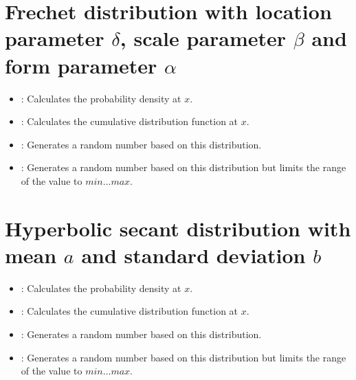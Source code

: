 \section{Frechet distribution with location parameter \texorpdfstring{$\delta$}{delta}, scale parameter \texorpdfstring{$\beta$}{beta} and form parameter \texorpdfstring{$\alpha$}{alpha}}

\begin{itemize}

\item
{}:
Calculates the probability density at $x$.

\item
{}:
Calculates the cumulative distribution function at $x$.

\item
{}:
Generates a random number based on this distribution.

\item
{}:
Generates a random number based on this distribution but limits the range of the value to $min\ldots max$.

\end{itemize}



\section{Hyperbolic secant distribution with mean \texorpdfstring{$a$}{a} and standard deviation \texorpdfstring{$b$}{b}}

\begin{itemize}

\item
{}:
Calculates the probability density at $x$.

\item
{}:
Calculates the cumulative distribution function at $x$.

\item
{}:
Generates a random number based on this distribution.

\item
{}:
Generates a random number based on this distribution but limits the range of the value to $min\ldots max$.

\end{itemize}



